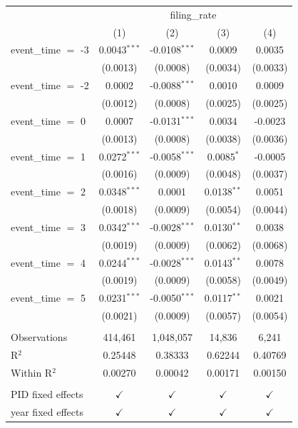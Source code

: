 
\begingroup
\centering
\begin{tabular}{lcccc}
   \toprule
    & \multicolumn{4}{c}{filing\_rate}\\
                       & (1)            & (2)             & (3)           & (4)\\  
   \midrule 
   event\_time $=$ -3  & 0.0043$^{***}$ & -0.0108$^{***}$ & 0.0009        & 0.0035\\   
                       & (0.0013)       & (0.0008)        & (0.0034)      & (0.0033)\\   
   event\_time $=$ -2  & 0.0002         & -0.0088$^{***}$ & 0.0010        & 0.0009\\   
                       & (0.0012)       & (0.0008)        & (0.0025)      & (0.0025)\\   
   event\_time $=$ 0   & 0.0007         & -0.0131$^{***}$ & 0.0034        & -0.0023\\   
                       & (0.0013)       & (0.0008)        & (0.0038)      & (0.0036)\\   
   event\_time $=$ 1   & 0.0272$^{***}$ & -0.0058$^{***}$ & 0.0085$^{*}$  & -0.0005\\   
                       & (0.0016)       & (0.0009)        & (0.0048)      & (0.0037)\\   
   event\_time $=$ 2   & 0.0348$^{***}$ & 0.0001          & 0.0138$^{**}$ & 0.0051\\   
                       & (0.0018)       & (0.0009)        & (0.0054)      & (0.0044)\\   
   event\_time $=$ 3   & 0.0342$^{***}$ & -0.0028$^{***}$ & 0.0130$^{**}$ & 0.0038\\   
                       & (0.0019)       & (0.0009)        & (0.0062)      & (0.0068)\\   
   event\_time $=$ 4   & 0.0244$^{***}$ & -0.0028$^{***}$ & 0.0143$^{**}$ & 0.0078\\   
                       & (0.0019)       & (0.0009)        & (0.0058)      & (0.0049)\\   
   event\_time $=$ 5   & 0.0231$^{***}$ & -0.0050$^{***}$ & 0.0117$^{**}$ & 0.0021\\   
                       & (0.0021)       & (0.0009)        & (0.0057)      & (0.0054)\\   
    \\
   Observations        & 414,461        & 1,048,057       & 14,836        & 6,241\\  
   R$^2$               & 0.25448        & 0.38333         & 0.62244       & 0.40769\\  
   Within R$^2$        & 0.00270        & 0.00042         & 0.00171       & 0.00150\\  
    \\
   PID fixed effects   & $\checkmark$   & $\checkmark$    & $\checkmark$  & $\checkmark$\\   
   year fixed effects  & $\checkmark$   & $\checkmark$    & $\checkmark$  & $\checkmark$\\   
   \bottomrule
\end{tabular}
\par\endgroup


